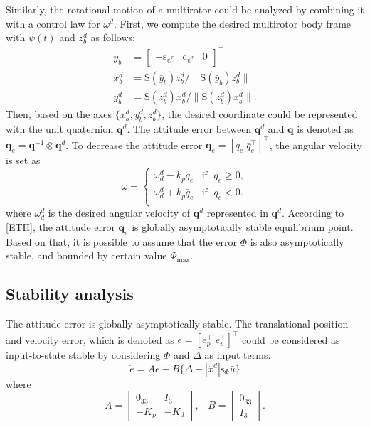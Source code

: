 \documentclass[letterpaper, 10 pt, conference]{ieeeconf}  %
\begin{document}
Similarly, the rotational motion of a multirotor could be analyzed by combining it with a control law for $\omega^d$. 
First, we compute the desired multirotor body frame with $\psi(t)$ and $z_b^d$ as follows:
\begin{align}
\bar{y}_b &= [\begin{array}{ccc}-\text{s}_{\psi^r}&\text{c}_{\psi^r}&0\end{array}]^\intercal \nonumber \\
x_b^d &= \text{S}(\bar{y}_b)z_b^d / \|\text{S}(\bar{y}_b)z_b^d \| \nonumber \\ 
y_b^d &= \text{S}({z}_b^d)x_b^d / \|\text{S}(z_b^d)x_b^d \|. \nonumber  
\end{align}
Then, based on the axes $\{x_b^d,y_b^d,z_b^d\}$, the desired coordinate could be represented with the unit quaternion $\textbf{q}^d$. 
The attitude error between $\textbf{q}^d$ and $\textbf{q}$ is denoted as $\textbf{q}_e = \textbf{q}^{-1}\otimes \textbf{q}^d$. To decrease the attitude error $\textbf{q}_e = [q_e\;\bar{q}_e^\intercal]^\intercal$, the angular velocity is set as 
\begin{equation}
\omega = \left\{
\begin{array}{ll}
\omega_d^d - k_p \bar{q}_e & \text{if  }\;q_e \geq 0, \\ 
\omega_d^d + k_p \bar{q}_e & \text{if  }\;q_e < 0. \\ 
\end{array}
\right.
\end{equation}
where $\omega_d^d$ is the desired angular velocity of $\textbf{q}^d$ represented in $\textbf{q}^d$.
According to [ETH], the attitude error $\textbf{q}_e$ is globally asymptotically stable equilibrium point. 
Based on that, it is possible to assume that the error $\Phi$ is also asymptotically stable, and bounded by certain value $\Phi_{\max}$.

\subsection{Stability analysis}
The attitude error is globally asymptotically stable.
The translational position and velocity error, which is denoted as $e = [e_p^\intercal\;e_v^\intercal]^\intercal$ could be considered as input-to-state stable by considering $\Phi$ and $\Delta$ as input terms. 
\begin{equation}
\dot{e} = Ae
 + B\{\Delta+|\ddot{x}^d|\text{s}_\Phi\bar{u}\} \label{eq:translationalError} 
\end{equation}
where
\begin{equation}
A = \left[
\begin{array}{rr}
0_{33} & I_3 \\ -K_p & -K_d 
\end{array}
\right],\;\;\;B = \left[
\begin{array}{r}
0_{33} \\ I_3
\end{array}
\right]. 
\end{equation}
\end{document}

